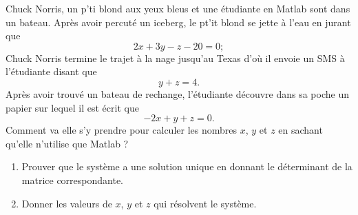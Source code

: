 \begin{exercice}\label{exotestMAT1151-G310002}

	Chuck Norris, un p'ti blond aux yeux bleus et une étudiante en Matlab sont dans un bateau. Après avoir percuté un iceberg, le pt'it blond se jette à l'eau en jurant que
	\begin{equation}
		2x+3y-z-20=0;
	\end{equation}
	Chuck Norris termine le trajet à la nage jusqu'au Texas d'où il envoie un SMS à l'étudiante disant que
	\begin{equation}
		y+z=4.
	\end{equation}
	Après avoir trouvé un bateau de rechange, l'étudiante découvre dans sa poche un papier sur lequel il est écrit que
	\begin{equation}
		-2x+y+z=0.
	\end{equation}
	Comment va elle s'y prendre pour calculer les nombres $x$, $y$ et $z$ en sachant qu'elle n'utilise que Matlab ? 
	\begin{enumerate}

		\item
			Prouver que le système a une solution unique en donnant le déterminant de la matrice correspondante.
		\item
			Donner les valeurs de $x$, $y$ et $z$ qui résolvent le système.
	\end{enumerate}
	
\end{exercice}
